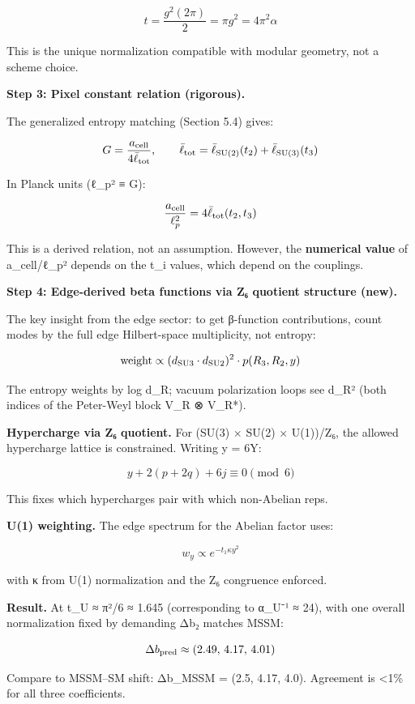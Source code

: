 \[
t = \frac{g^2(2\pi)}{2} = \pi g^2 = 4\pi^2 \alpha
\]

This is the unique normalization compatible with modular geometry, not a scheme choice.

\textbf{Step 3: Pixel constant relation (rigorous).}

The generalized entropy matching (Section 5.4) gives:

\[
G = \frac{a_{\rm cell}}{4\bar{\ell}_{\rm tot}}, \qquad
\bar{\ell}_{\rm tot} = \bar{\ell}_{\rm SU(2)}(t_2) + \bar{\ell}_{\rm SU(3)}(t_3)
\]

In Planck units (ℓ\_p² ≡ G):

\[
\frac{a_{\rm cell}}{\ell_p^2} = 4\bar{\ell}_{\rm tot}(t_2, t_3)
\]

This is a derived relation, not an assumption. However, the \textbf{numerical value} of a\_cell/ℓ\_p² depends on the t\_i values, which depend on the couplings.

\textbf{Step 4: Edge-derived beta functions via Z₆ quotient structure (new).}

The key insight from the edge sector: to get β-function contributions, count modes by the full edge Hilbert-space multiplicity, not entropy:

\[
\text{weight} \propto (d_{\rm SU3} \cdot d_{\rm SU2})^2 \cdot p(R_3, R_2, y)
\]

The entropy weights by log d\_R; vacuum polarization loops see d\_R² (both indices of the Peter-Weyl block V\_R ⊗ V\_R*).

\textbf{Hypercharge via Z₆ quotient.} For (SU(3) × SU(2) × U(1))/Z₆, the allowed hypercharge lattice is constrained. Writing y = 6Y:

\[
y + 2(p + 2q) + 6j \equiv 0 \pmod{6}
\]

This fixes which hypercharges pair with which non-Abelian reps.

\textbf{U(1) weighting.} The edge spectrum for the Abelian factor uses:

\[
w_y \propto e^{-t_1 \kappa y^2}
\]

with κ from U(1) normalization and the Z₆ congruence enforced.

\textbf{Result.} At t\_U ≈ π²/6 ≈ 1.645 (corresponding to α\_U⁻¹ ≈ 24), with one overall normalization fixed by demanding Δb₂ matches MSSM:

\[
\Delta b_{\rm pred} \approx (2.49, \, 4.17, \, 4.01)
\]

Compare to MSSM--SM shift: Δb\_MSSM = (2.5, 4.17, 4.0). Agreement is \textless1\% for all three coefficients.

